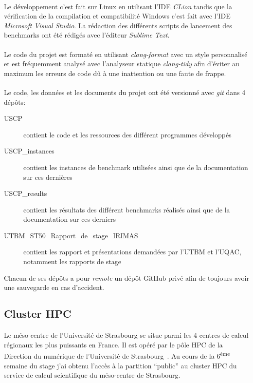 \documentclass[a4paper,11pt,twoside,french,report]{../common/simplem}
\begin{document}
				\paragraph*{}
					Le développement c'est fait sur Linux en utilisant l'\gls{IDE} \textit{CLion} tandis que la vérification de la compilation et compatibilité Windows c'est fait avec l'\gls{IDE} \textit{Microsoft Visual Studio}. La rédaction des différents scripts de lancement des benchmarks ont été rédigés avec l'éditeur \textit{Sublime Text}.
				\paragraph*{}
					Le code du projet est formaté en utilisant \textit{clang-format} avec un style personnalisé et est fréquemment analysé avec l'analyseur statique \textit{clang-tidy} afin d'éviter au maximum les erreurs de code dû à une inattention ou une faute de frappe.
				\paragraph*{}
					Le code, les données et les documents du projet ont été versionné avec \textit{git} dans 4 dépôts:
					\begin{description}
						\item[USCP] contient le code et les ressources des différent programmes développés
						\item[USCP\_instances] contient les instances de benchmark utilisées ainsi que de la documentation sur ces dernières
						\item[USCP\_results] contient les résultats des différent benchmarks réalisés ainsi que de la documentation sur ces derniers
						\item[UTBM\_ST50\_Rapport\_de\_stage\_IRIMAS] contient les rapport et présentations demandées par l'\gls{UTBM} et l'\gls{UQAC}, notamment les rapports de stage
					\end{description}
					Chacun de ses dépôts a pour \textit{remote} un dépôt GitHub privé afin de toujours avoir une sauvegarde en cas d'accident.
			\subsection{Cluster \acrshort{HPC}}
				\paragraph*{}
					Le méso-centre de l'Université de Strasbourg se situe parmi les 4 centres de calcul régionaux les plus puissants en France. Il est opéré par le pôle \gls{HPC} de la Direction du numérique de l'Université de Strasbourg~\cite{UNISTRA_Calcul_scientifique}. Au cours de la 6\textsuperscript{ème} semaine du stage j'ai obtenu l'accès à la partition ``public'' au cluster \gls{HPC} du service de calcul scientifique du méso-centre de Strasbourg.
\end{document}
